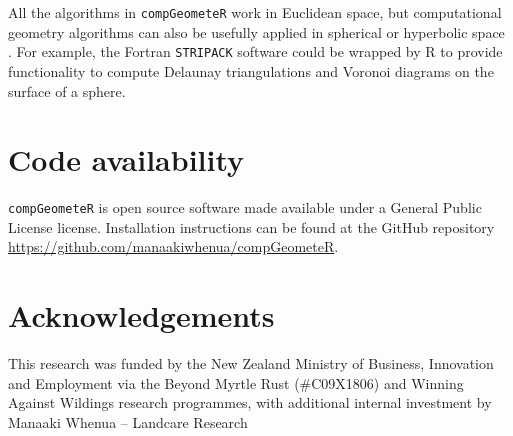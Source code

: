 \documentclass[12pt, a4paper]{article}
\begin{document}
All the algorithms in \texttt{compGeometeR} work in Euclidean space, but computational geometry algorithms can also be usefully applied in spherical or hyperbolic space \citep{gowers-2003}.  For example, the Fortran \texttt{STRIPACK} software \citep{renka-1997} could be wrapped by R to provide functionality to compute Delaunay triangulations and Voronoi diagrams on the surface of a sphere.

\section{Code availability}

\texttt{compGeometeR} is open source software made available under a General Public License license. Installation instructions can be found at the GitHub repository \url{https://github.com/manaakiwhenua/compGeometeR}.

\section{Acknowledgements}

This research was funded by the New Zealand Ministry of Business, Innovation and Employment via the Beyond Myrtle Rust (\#C09X1806) and Winning Against Wildings research programmes, with additional internal investment by Manaaki Whenua -- Landcare Research



\end{document}

